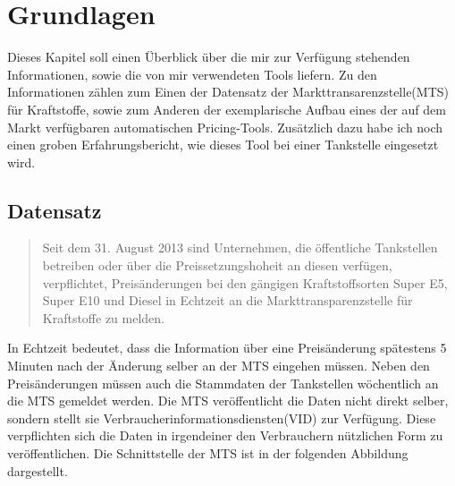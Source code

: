 \documentclass[12pt,a4paper,bibliography=totocnumbered,listof=totocnumbered]{scrartcl}
\begin{document}
\newpage
\vspace{-1,2em}
\section{Grundlagen}
Dieses Kapitel soll einen Überblick über die mir zur Verfügung stehenden Informationen, sowie die von mir verwendeten Tools liefern. 
Zu den Informationen zählen zum Einen der Datensatz der Markttransarenzstelle(MTS) für Kraftstoffe, sowie zum Anderen der exemplarische Aufbau eines der auf dem Markt verfügbaren automatischen Pricing-Tools. Zusätzlich dazu habe ich noch einen groben Erfahrungsbericht, wie dieses Tool bei einer Tankstelle eingesetzt wird.

\subsection{Datensatz}

\begin{quote} 
\glqq Seit dem 31. August 2013 sind Unternehmen, die öffentliche Tankstellen betreiben oder über die Preissetzungshoheit an diesen verfügen, verpflichtet, Preisänderungen bei den gängigen Kraftstoffsorten Super E5, Super E10 und Diesel in Echtzeit an die Markttransparenzstelle für Kraftstoffe zu melden.\grqq\cite{BkMTS}
\end{quote}

In Echtzeit bedeutet, dass die Information über eine Preisänderung spätestens 5 Minuten nach der Änderung selber an der MTS eingehen müssen. Neben den Preisänderungen müssen auch die Stammdaten der Tankstellen wöchentlich an die MTS gemeldet werden. Die MTS veröffentlicht die Daten nicht direkt selber, sondern stellt sie Verbraucherinformationsdiensten(VID) zur Verfügung. Diese verpflichten sich die Daten in irgendeiner den Verbrauchern nützlichen Form zu veröffentlichen. Die Schnittstelle der MTS ist in der folgenden Abbildung dargestellt.
\end{document}

